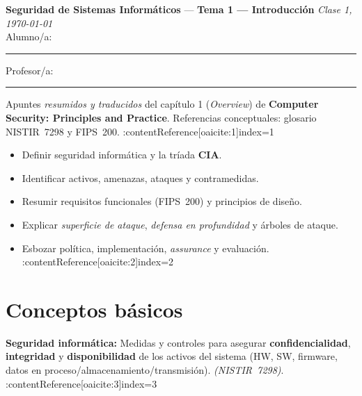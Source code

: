 \documentclass[11pt,a4paper]{article}
\newcommand{\asignatura}{Seguridad de Sistemas Informáticos}
\newcommand{\tema}{Tema 1 — Introducción}
\newcommand{\clase}{Clase 1}
\newcommand{\fecha}{\today}
\begin{document}
    {\large \textbf{\asignatura} \;—\; \textbf{\tema} \hfill \textit{\clase, \fecha}}\\[0.6em]
    \faUser\; Alumno/a: \rule{5cm}{0.4pt} \hfill
    \faChalkboardTeacher\; Profesor/a: \rule{5cm}{0.4pt}

    \vspace{1em}
    \tableofcontents
    \vspace{1em}

    \begin{NotaBox}
        Apuntes \textit{resumidos y traducidos} del capítulo 1 (\textit{Overview}) de \textbf{Computer Security: Principles and Practice}. Referencias conceptuales: glosario NISTIR~7298 y FIPS~200. :contentReference[oaicite:1]{index=1}
    \end{NotaBox}

    \begin{ObjetivosBox}
        \begin{itemize}
            \item Definir seguridad informática y la tríada \textbf{CIA}.
            \item Identificar activos, amenazas, ataques y contramedidas.
            \item Resumir requisitos funcionales (FIPS~200) y principios de diseño.
            \item Explicar \textit{superficie de ataque}, \textit{defensa en profundidad} y árboles de ataque.
            \item Esbozar política, implementación, \textit{assurance} y evaluación. :contentReference[oaicite:2]{index=2}
        \end{itemize}
    \end{ObjetivosBox}

    \section{Conceptos básicos}
    \begin{DefBox}
        \textbf{Seguridad informática:} Medidas y controles para asegurar \textbf{confidencialidad}, \textbf{integridad} y \textbf{disponibilidad} de los activos del sistema (HW, SW, firmware, datos en proceso/almacenamiento/transmisión). \textit{(NISTIR~7298)}. :contentReference[oaicite:3]{index=3}
    \end{DefBox}
\end{document}
